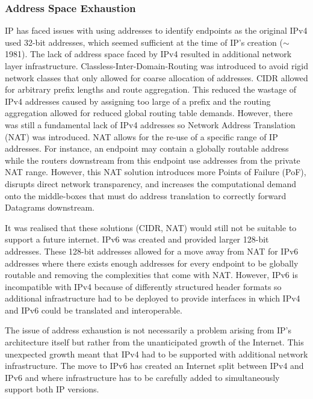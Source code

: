 \documentclass[12pt]{report}
\begin{document}
 \subsubsection{Address Space Exhaustion}
 IP has faced issues with using addresses to identify endpoints as the original IPv4 used 32-bit addresses, which seemed sufficient at the time of IP's creation ($\sim$1981). The lack of address space faced by IPv4 resulted in additional network layer infrastructure. Classless-Inter-Domain-Routing was introduced to avoid rigid network classes that only allowed for coarse allocation of addresses.\cite{fuller_classless_1993} 
CIDR allowed for arbitrary prefix lengths and route aggregation.
This reduced the wastage of IPv4 addresses caused by assigning too large of a prefix and the routing aggregation allowed for reduced global routing table demands. However, there was still a fundamental lack of IPv4 addresses so Network Address Translation (NAT) was introduced\cite{egevang_ip_1994}. NAT allows for the re-use of a specific range of IP addresses\cite{rekhter_address_1996}. For instance, an endpoint may contain a globally routable address while the routers downstream from this endpoint use addresses from the private NAT range.
However, this NAT solution introduces more Points of Failure (PoF), disrupts direct network transparency, and increases the computational demand onto the middle-boxes that must do address translation to correctly forward Datagrams downstream.


It was realised that these solutions (CIDR, NAT) would still not be suitable to support a future internet. IPv6 was created and provided larger 128-bit addresses. These 128-bit addresses allowed for a move away from NAT for IPv6 addresses where there exists enough addresses for every endpoint to be globally routable and removing the complexities that come with NAT. However, IPv6 is incompatible with IPv4 because of differently structured header formats so additional infrastructure had to be deployed to provide interfaces in which IPv4 and IPv6 could be translated and interoperable. 


The issue of address exhaustion is not necessarily a problem arising from IP's architecture itself but rather from the unanticipated growth of the Internet. This unexpected growth meant that IPv4 had to be supported with additional network infrastructure. The move to IPv6 has created an Internet split between IPv4 and IPv6 and where infrastructure has to be carefully added to simultaneously support both IP versions.
\end{document}
